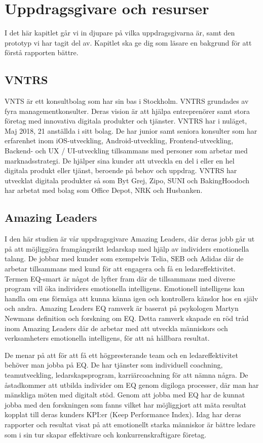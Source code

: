 \section{Uppdragsgivare och resurser}
I det här kapitlet går vi in djupare på
vilka uppdragsgivarna är, samt den prototyp vi har tagit del av. Kapitlet ska ge dig som läsare en bakgrund för att förstå rapporten bättre.  

\subsection{VNTRS}
VNTS är ett konsultbolag som har sin bas i Stockholm. VNTRS grundades av fyra managementkonsulter. Deras vision är att hjälpa entreprenörer samt stora företag med innovativa digitala produkter och tjänster. VNTRS har i nuläget, Maj 2018, 21 anställda i sitt bolag. De har junior samt seniora konsulter som har erfarenhet inom iOS-utveckling, Android-utveckling, Frontend-utveckling, Backend- och UX / UI-utveckling tillsammans med personer som arbetar med marknadsstrategi. De hjälper sina kunder att utveckla en del i eller en hel digitala produkt eller tjänst, beroende på behov och uppdrag. VNTRS har utvecklat digitala produkter så som Byt Grej, Zipo, SUNI och BakingHood\cite{VNTRSAB}och har arbetat med bolag som Office Depot, NRK och Husbanken. 

\subsection{Amazing Leaders}
I den här studien är vår uppdragsgivare Amazing Leaders, där deras jobb går ut på att möjliggöra framgångsrikt ledarskap med hjälp av individers emotionella talang. De jobbar med kunder som exempelvis Telia, SEB och Adidas där de arbetar tillsammans med kund för att engagera och få en ledareffektivitet. Termen EQ-smart är något de lyfter fram där de tillsammans med diverse program vill öka individers emotionella intelligens. Emotionell intelligens kan handla om ens förmåga att kunna känna igen och kontrollera känslor hos en själv och andra. Amazing Leaders EQ ramverk är baserat på psykologen Martyn Newmans definition och forskning om EQ. Detta ramverk skapade en röd tråd inom Amazing Leaders där de arbetar med att utveckla människors och verksamheters emotionella intelligens, för att nå hållbara resultat. 
\newline

De menar på att för att få ett högpresterande team och en ledareffektivitet behöver man jobba på EQ. De har tjänster som individuell coachning, teamutveckling, ledarskapsprogram, karriärcoachning för att nämna några. De åstadkommer att utbilda individer om EQ genom digiloga processer, där man har mänskliga möten med digitalt stöd. Genom att jobba med EQ har de kunnat jobba med den forskningen som fanns vilket har möjliggjort att mäta resultat kopplat till deras kunders KPI:er (Keep Performance Index). Idag har deras rapporter och resultat visat på att emotionellt starka människor är bättre ledare som i sin tur skapar effektivare och konkurrenskraftigare företag. {\cite{AmazingLeaders2017OmLeaders}}
\newline

